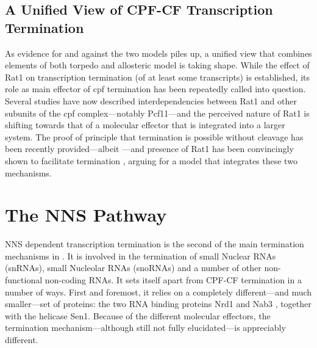 \subsection{A Unified View of CPF-CF Transcription Termination}

As evidence for and against the two models piles up, a unified view that combines elements of both torpedo and allosteric model is taking shape.
While the effect of Rat1 on transcription termination (of at least some transcripts) is established, its role as main effector of \gls{cpf} termination has been repeatedly called into question.
Several studies have now described interdependencies between Rat1 and other subunits of the \gls{cpf} complex---notably Pcf11---and the perceived nature of Rat1 is shifting towards that of a molecular effector  that is integrated into a larger system.
The proof of principle that termination is possible without cleavage has been recently provided---albeit \invitro{} \cite{zhang:2015:polya}---and presence of Rat1 has been convincingly shown to facilitate termination \cite{fong:2015:effects}, arguing for a model that integrates these two mechanisms.


\clearpage

\section{The NNS Pathway}

NNS dependent transcription termination is the second of the main termination mechanisms in \cer{}. 
It is involved in the termination of small Nuclear RNAs (snRNAs), small Nucleolar RNAs (snoRNAs) and a number of other non-functional non-coding RNAs.
It sets itself apart from CPF-CF termination in a number of ways.
First and foremost, it relies on a completely different---and much smaller---set of proteins: the two RNA binding proteins Nrd1 and Nab3 \cite{conrad:2000:yeast}, together with the helicase Sen1. 
Because of the different molecular effectors, the termination mechanism---although still not fully elucidated---is appreciably different. 


